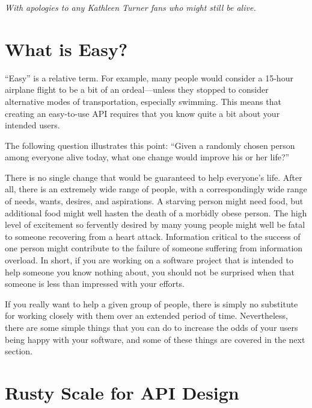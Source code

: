 
%
	 {\emph{With apologies to any Kathleen Turner fans who might
	  still be alive.}}

\section{What is Easy?}
\label{sec:easy:What is Easy?}

``Easy'' is a relative term.
For example, many people would consider a 15-hour airplane flight to be
a bit of an ordeal---unless they stopped to consider alternative modes
of transportation, especially swimming.
This means that creating an easy-to-use API requires that you know
quite a bit about your intended users.

The following question illustrates this point: ``Given a randomly chosen
person among everyone alive today, what one change would
improve his or her life?''

There is no single change that would be guaranteed to help everyone's life.
After all, there is an extremely wide range of people, with a correspondingly
wide range of needs, wants, desires, and aspirations.
A starving person might need food, but additional food might well hasten
the death of a morbidly obese person.
The high level of excitement so fervently desired by many young people
might well be fatal to someone recovering from a heart attack.
Information critical to the success of one person might contribute to
the failure of someone suffering from information overload.
In short, if you are working on a software project that is intended to
help someone you know nothing about, you should not be surprised when
that someone is less than impressed with your efforts.

If you really want to help a given group of people, there is simply no
substitute for working closely with them over an extended period of time.
Nevertheless, there are some simple things that you can do to increase
the odds of your users being happy with your software, and some of these
things are covered in the next section.

\section{Rusty Scale for API Design}
\label{sec:easy:Rusty Scale for API Design}

